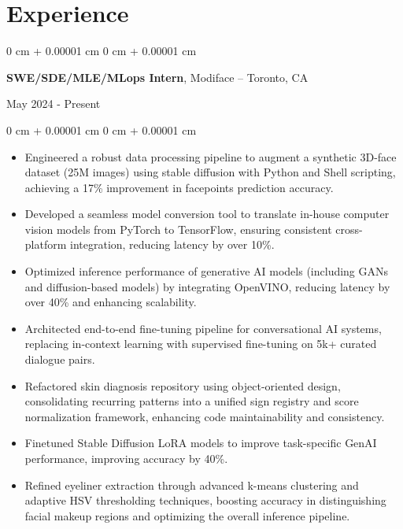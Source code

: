 \documentclass[11pt, letterpaper]{article}
\newenvironment{highlights}{
    \begin{itemize}[
        topsep=0.08 cm,
        parsep=0.08 cm,
        partopsep=0pt,
        itemsep=0pt,
        leftmargin=0.2 cm + 17pt
    ]
}
{
    \end{itemize}
}
\newenvironment{onecolentry}{
    \begin{adjustwidth}{
        0 cm + 0.00001 cm
    }{
        0 cm + 0.00001 cm
    }
}{
    \end{adjustwidth}
}
\newenvironment{twocolentry}[2][]{
    \onecolentry
    \def\secondColumn{#2}
    \setcolumnwidth{\fill, 4.5 cm}
    \begin{paracol}{2}
}{
    \switchcolumn \raggedleft \secondColumn
    \end{paracol}
    \endonecolentry
}
\begin{document}
\section{Experience}
\vspace{0.08 cm}
\begin{twocolentry}{May 2024 - Present}
    {\textbf{SWE/SDE/MLE/MLops Intern}}, Modiface -- Toronto, CA
\end{twocolentry}
\vspace{0.05 cm}
\begin{onecolentry}
    \begin{highlights}
        \item Engineered a robust data processing pipeline to augment a synthetic 3D-face dataset (25M images) using stable diffusion with Python and Shell scripting, achieving a 17\% improvement in facepoints prediction accuracy.
        \item Developed a seamless model conversion tool to translate in-house computer vision models from PyTorch to TensorFlow, ensuring consistent cross-platform integration, reducing latency by over 10\%.
        \item Optimized inference performance of generative AI models (including GANs and diffusion-based models) by integrating OpenVINO, reducing latency by over 40\% and enhancing scalability.
        \item Architected end-to-end fine-tuning pipeline for conversational AI systems, replacing in-context learning with supervised fine-tuning on 5k+ curated dialogue pairs.
        \item Refactored skin diagnosis repository using object-oriented design, consolidating recurring patterns into a unified sign registry and score normalization framework, enhancing code maintainability and consistency.
        \item Finetuned Stable Diffusion LoRA models to improve task-specific GenAI performance, improving accuracy by 40\%.
        \item Refined eyeliner extraction through advanced k-means clustering and adaptive HSV thresholding techniques, boosting accuracy in distinguishing facial makeup regions and optimizing the overall inference pipeline.
    \end{highlights}
\end{onecolentry}
\vspace{0.35 cm}
\end{document}
